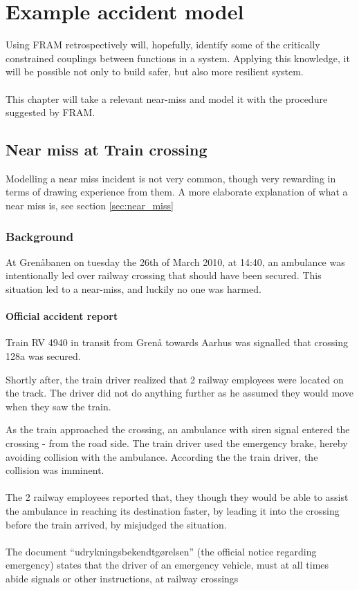 \documentclass[10pt,oneside]{book}                  %
\begin{document}
\markboth{}{}
\chapter{Example accident model}
\label{ch:accident_model}
Using FRAM retrospectively will, hopefully, identify some of the critically constrained couplings between functions in a system. Applying this knowledge, it will be possible not only to build safer, but also more resilient system.\\
\\
This chapter will take a relevant near-miss and model it with the procedure suggested by FRAM. 

\section{Near miss at Train crossing}
Modelling a near miss incident is not very common, though very rewarding in terms of drawing experience from them. A more elaborate explanation of what a near miss is, see section \ref{sec:near_miss}


\subsection{Background}
At Grenåbanen on tuesday the 26th of March 2010, at 14:40, an ambulance was intentionally led over railway crossing that should have been secured. This situation led to a near-miss, and luckily no one was harmed.

\subsubsection{Official accident report}
Train RV 4940 in transit from Grenå towards Aarhus was signalled that crossing 128a was secured.

Shortly after, the train driver realized that 2 railway employees were located on the track. The driver did not do anything further as he assumed they would move when they saw the train.

As the train approached the crossing, an ambulance with siren signal entered the crossing - from the road side. The train driver used the emergency brake, hereby avoiding collision with the ambulance. According the the train driver, the collision was imminent.\\
\\
The 2 railway employees reported that, they though they would be able to assist the ambulance in reaching its destination faster, by leading it into the crossing before the train arrived, by misjudged the situation.\\
\\
The document ``udrykningsbekendtgørelsen'' (the official notice regarding emergency) states that the driver of an emergency vehicle, must at all times abide signals or other instructions, at railway crossings
\end{document}
